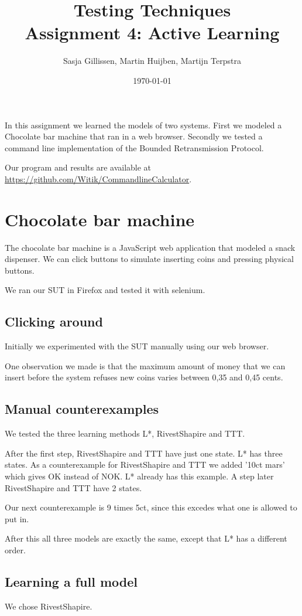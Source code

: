 \documentclass[11pt,a4paper]{article}
\author{Sasja Gillissen, Martin Huijben, Martijn Terpstra}
\date{\today}
\title{Testing Techniques\\
  \textbf{Assignment 4: Active Learning}}
\begin{document}
\maketitle

In this assignment we learned the models of two systems. First we
modeled a Chocolate bar machine that ran in a web browser. Secondly we
tested a command line implementation of the Bounded Retransmission Protocol.

Our program and results are available at \url{https://github.com/Witik/CommandlineCalculator}.

\section{Chocolate bar machine}
The chocolate bar machine is a JavaScript web application that modeled
a snack dispenser. We can click buttons to simulate inserting coins
and pressing physical buttons.

We ran our SUT in Firefox and tested it with selenium.

\subsection{Clicking around}
Initially we experimented with the SUT manually using our web browser.

One observation we made is that the maximum amount of money that we
can insert before the system refuses new coins varies between 0,35 and
0,45 cents.

\subsection{Manual counterexamples}
We tested the three learning methods L*, RivestShapire and TTT.

After the first step, RivestShapire and TTT have just one state. L*
has three states. As a counterexample for RivestShapire and TTT we
added '10ct mars' which gives OK instead of NOK. L* already has this example. A step later RivestShapire and TTT have 2 states.

Our next counterexample is 9 times 5ct, since this excedes what one is allowed to put in. 

After this all three models are exactly the same, except that L* has a different order.


\subsection{Learning a full model}
We chose RivestShapire. 
\end{document}
